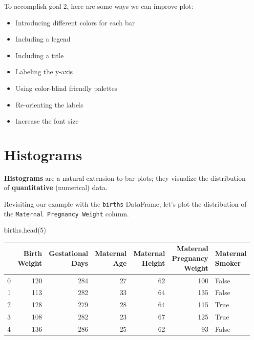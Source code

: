\documentclass[
  letterpaper,
  DIV=11,
  numbers=noendperiod]{scrreprt}
\newenvironment{Shaded}{\begin{snugshade}}{\end{snugshade}}
\newcommand{\DecValTok}[1]{\textcolor[rgb]{0.68,0.00,0.00}{#1}}
\newcommand{\NormalTok}[1]{\textcolor[rgb]{0.00,0.23,0.31}{#1}}
\providecommand{\tightlist}{%
  \setlength{\itemsep}{0pt}\setlength{\parskip}{0pt}}\usepackage{longtable,booktabs,array}
\begin{document}
To accomplish goal 2, here are some ways we can improve plot:

\begin{itemize}
\tightlist
\item
  Introducing different colors for each bar
\item
  Including a legend
\item
  Including a title
\item
  Labeling the y-axis
\item
  Using color-blind friendly palettes
\item
  Re-orienting the labels
\item
  Increase the font size
\end{itemize}

\hypertarget{histograms}{%
\section{Histograms}\label{histograms}}

\textbf{Histograms} are a natural extension to bar plots; they visualize
the distribution of \textbf{quantitative} (numerical) data.

Revisiting our example with the \texttt{births} DataFrame, let's plot
the distribution of the \texttt{Maternal\ Pregnancy\ Weight} column.

\begin{Shaded}
\begin{Highlighting}[]
\NormalTok{births.head(}\DecValTok{5}\NormalTok{)}
\end{Highlighting}
\end{Shaded}

\begin{tabular}{lrrrrrl}
\toprule
{} &  Birth Weight &  Gestational Days &  Maternal Age &  Maternal Height &  Maternal Pregnancy Weight &  Maternal Smoker \\
\midrule
0 &           120 &               284 &            27 &               62 &                        100 &            False \\
1 &           113 &               282 &            33 &               64 &                        135 &            False \\
2 &           128 &               279 &            28 &               64 &                        115 &             True \\
3 &           108 &               282 &            23 &               67 &                        125 &             True \\
4 &           136 &               286 &            25 &               62 &                         93 &            False \\
\bottomrule
\end{tabular}
\end{document}
